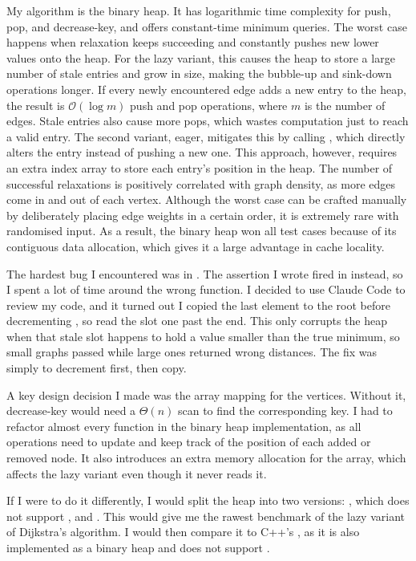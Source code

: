 My algorithm is the binary heap. It has logarithmic time complexity for push,
pop, and decrease-key, and offers constant-time minimum queries. The worst case
happens when relaxation keeps succeeding and constantly pushes new lower values
onto the heap. For the lazy variant, this causes the heap to store a large
number of stale entries and grow in size, making the bubble-up and sink-down
operations longer. If every newly encountered edge adds a new entry to the heap,
the result is $\mathcal{O}(\log m)$ push and pop operations, where $m$ is the
number of edges. Stale entries also cause more pops, which wastes computation
just to reach a valid entry. The second variant, eager, mitigates this by
calling , which directly alters the entry instead of
pushing a new one. This approach, however, requires an extra index array to
store each entry's position in the heap. The number of successful relaxations is
positively correlated with graph density, as more edges come in and out of each
vertex. Although the worst case can be crafted manually by deliberately placing
edge weights in a certain order, it is extremely rare with randomised input. As
a result, the binary heap won all test cases because of its contiguous data
allocation, which gives it a large advantage in cache locality.

The hardest bug I encountered was in . The assertion I wrote
fired in  instead, so I spent a lot of time around the
wrong function. I decided to use Claude Code to review my code, and it turned
out I copied the last element to the root before decrementing , so
 read the slot one past the end. This only
corrupts the heap when that stale slot happens to hold a value smaller than the
true minimum, so small graphs passed while large ones returned wrong distances.
The fix was simply to decrement first, then copy.

A key design decision I made was the  array mapping for the
vertices. Without it, decrease-key would need a $\Theta(n)$ scan to find the
corresponding key. I had to refactor almost every function in the binary heap
implementation, as all operations need to update and keep track of the position
of each added or removed node. It also introduces an extra memory allocation for
the array, which affects the lazy variant even though it never reads it.

If I were to do it differently, I would split the heap into two versions:
, which does not support , and
. This would give me the rawest benchmark of the lazy
variant of Dijkstra's algorithm. I would then compare it to C++'s
, as it is also implemented as a binary heap and does
not support .

